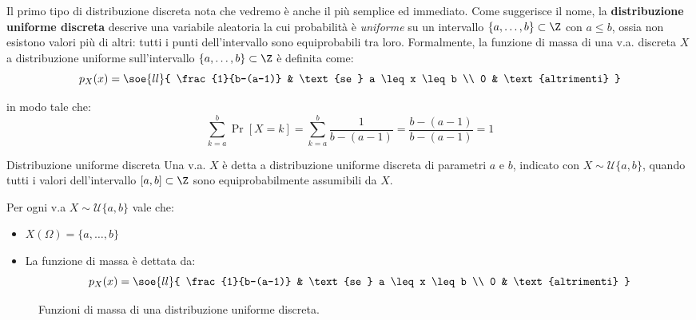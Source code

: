 \documentclass[a4paper, 12pt]{report}
\begin{document}
    Il primo tipo di distribuzione discreta nota che vedremo è anche il più semplice ed immediato. Come suggerisce il nome, la \textbf{distribuzione uniforme discreta} descrive una variabile aleatoria la cui probabilità è \textit{uniforme} su un intervallo $\{a, \ldots, b\} \subset \Z$ con $a \leq b$, ossia non esistono valori più  di altri: tutti i punti dell'intervallo sono equiprobabili tra loro. Formalmente, la funzione di massa di una v.a. discreta $X$ a distribuzione uniforme sull'intervallo $\{a,\ldots, b\} \subset \Z$ è definita come:
    \[p_X(x) = \soe{ll}{
        \frac{1}{b-(a-1)} & \text{se } a \leq x \leq b \\
        0 & \text{altrimenti}
    }\]

    in modo tale che:
    \[\sum_{k = a}^b \Pr[X = k] = \sum_{k = a}^b \frac{1}{b-(a-1)} = \frac{b-(a-1)}{b-(a-1)} = 1\]

    \begin{frameddefn}{Distribuzione uniforme discreta}
        Una v.a. $X$ è detta a distribuzione uniforme discreta di parametri $a$ e $b$, indicato con $X \sim \mathcal{U}\{a,b\}$, quando tutti i valori dell'intervallo $[a,b] \subset \Z$ sono equiprobabilmente assumibili da $X$.

        Per ogni v.a $X \sim \mathcal{U}\{a,b\}$ vale che:
        \begin{itemize}
            \item $X(\Omega) = \{a, \ldots, b\}$
            \item La funzione di massa è dettata da:
            \[p_X(x) = \soe{ll}{
                \frac{1}{b-(a-1)} & \text{se } a \leq x \leq b \\
                0 & \text{altrimenti}
            }\]
        \end{itemize}
    \end{frameddefn}

    \begin{figure}[H]
        \centering

        \caption{Funzioni di massa di una distribuzione uniforme discreta.}
    \end{figure}
    
\end{document}
